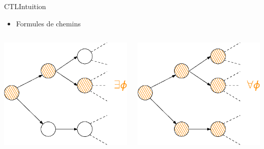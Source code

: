 \documentclass[compress]{beamer}
\begin{document}
\begin{frame}{CTL}{Intuition}
\vspace{-0.05\linewidth}
\begin{itemize}
  \item Formules de chemins \\
\end{itemize}
\vspace{0.05\linewidth}
\centering
\begin{columns}
  \begin{column}{0.5\linewidth}
    \includegraphics[width=\linewidth]{resources/ctl_path_formulae}
  \end{column}
  \begin{column}{0.5\linewidth}
    \includegraphics[width=\linewidth]{resources/ctl_path_formulae2}
  \end{column}
\end{columns}
\end{frame}
\end{document}
